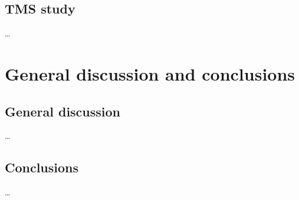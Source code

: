 \documentclass[12pt,]{book}
\begin{document}
\chapter{TMS study}\label{tms-study}

\ldots{}

\part{General discussion and
conclusions}\label{part-general-discussion-and-conclusions}

\chapter{General discussion}\label{general-discussion-1}

\ldots{}

\chapter{Conclusions}\label{conclusions}

\ldots{}

\noindent
\setlength{\parindent}{-0.20in} \setlength{\leftskip}{0.20in}
\setlength{\parskip}{8pt}


\end{document}
